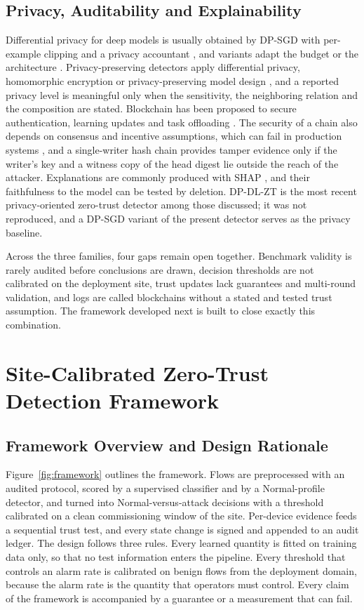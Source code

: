 \documentclass[journal]{IEEEtran}
\begin{document}
\subsection{Privacy, Auditability and Explainability}
Differential privacy for deep models is usually obtained by DP-SGD with per-example clipping and a privacy accountant \cite{abadi2016deep,dwork2014algorithmic,mironov2019sampled}, and variants adapt the budget or the architecture \cite{chen2023differentially,feng2023tensor}. Privacy-preserving detectors apply differential privacy, homomorphic encryption or privacy-preserving model design \cite{chen2025privacy,saheed2025cps,manh2025privacy,ferrag2024revolutionizing}, and a reported privacy level is meaningful only when the sensitivity, the neighboring relation and the composition are stated. Blockchain has been proposed to secure authentication, learning updates and task offloading \cite{wang2023lightweight,tong2024blockchain,xu2024digital}. The security of a chain also depends on consensus and incentive assumptions, which can fail in production systems \cite{zhang2024max}, and a single-writer hash chain provides tamper evidence only if the writer's key and a witness copy of the head digest lie outside the reach of the attacker. Explanations are commonly produced with SHAP \cite{lundberg2017unified,lundberg2020local}, and their faithfulness to the model can be tested by deletion. DP-DL-ZT is the most recent privacy-oriented zero-trust detector among those discussed; it was not reproduced, and a DP-SGD variant of the present detector serves as the privacy baseline.

Across the three families, four gaps remain open together. Benchmark validity is rarely audited before conclusions are drawn, decision thresholds are not calibrated on the deployment site, trust updates lack guarantees and multi-round validation, and logs are called blockchains without a stated and tested trust assumption. The framework developed next is built to close exactly this combination.

\section{Site-Calibrated Zero-Trust Detection Framework}\label{sec:method}
\subsection{Framework Overview and Design Rationale}
Figure~\ref{fig:framework} outlines the framework. Flows are preprocessed with an audited protocol, scored by a supervised classifier and by a Normal-profile detector, and turned into Normal-versus-attack decisions with a threshold calibrated on a clean commissioning window of the site. Per-device evidence feeds a sequential trust test, and every state change is signed and appended to an audit ledger. The design follows three rules. Every learned quantity is fitted on training data only, so that no test information enters the pipeline. Every threshold that controls an alarm rate is calibrated on benign flows from the deployment domain, because the alarm rate is the quantity that operators must control. Every claim of the framework is accompanied by a guarantee or a measurement that can fail.
\end{document}

